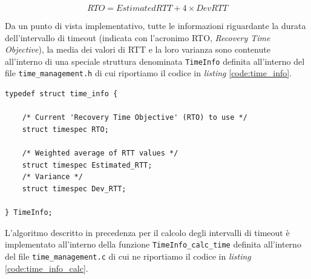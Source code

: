 \documentclass[10pt,a4paper, titlepage]{report}
\begin{document}
\begin{equation}
RTO = EstimatedRTT + 4 \times DevRTT
\end{equation}

Da un punto di vista implementativo, tutte le informazioni riguardante la durata dell'intervallo di timeout (indicata con l'acronimo RTO, \textit{Recovery Time Objective}), la media dei valori di RTT e la loro varianza sono contenute all'interno di una speciale struttura denominata \texttt{TimeInfo} definita all'interno del file \texttt{time\_management.h} di cui riportiamo il codice in \textit{listing} \ref{code:time_info}.

\begin{lstlisting}[frame=lines, caption={Implementazione della struttura \texttt{time\_info}}, label={code:time_info}]
typedef struct time_info {

	/* Current 'Recovery Time Objective' (RTO) to use */
	struct timespec RTO;

	/* Weighted average of RTT values */
	struct timespec Estimated_RTT;
	/* Variance */
	struct timespec Dev_RTT;

} TimeInfo;
\end{lstlisting}

L'algoritmo descritto in precedenza per il calcolo degli intervalli di timeout è implementato all'interno della funzione \texttt{TimeInfo\_calc\_time} definita all'interno del file \texttt{time\_management.c} di cui ne riportiamo il codice in \textit{listing} \ref{code:time_info_calc}. 
\end{document}

